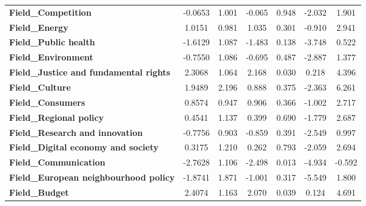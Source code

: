 \documentclass[ 11pt]{article}
\begin{document}
\begin{center}
\begin{longtable}{lcccccc}
\textbf{Field\_Competition}                                &      -0.0653  &        1.001     &    -0.065  &         0.948        &       -2.032    &        1.901     \\
\textbf{Field\_Energy}                                     &       1.0151  &        0.981     &     1.035  &         0.301        &       -0.910    &        2.941     \\
\textbf{Field\_Public health}                              &      -1.6129  &        1.087     &    -1.483  &         0.138        &       -3.748    &        0.522     \\
\textbf{Field\_Environment}                                &      -0.7550  &        1.086     &    -0.695  &         0.487        &       -2.887    &        1.377     \\
\textbf{Field\_Justice and fundamental rights}             &       2.3068  &        1.064     &     2.168  &         0.030        &        0.218    &        4.396     \\
\textbf{Field\_Culture}                                    &       1.9489  &        2.196     &     0.888  &         0.375        &       -2.363    &        6.261     \\
\textbf{Field\_Consumers}                                  &       0.8574  &        0.947     &     0.906  &         0.366        &       -1.002    &        2.717     \\
\textbf{Field\_Regional policy}                            &       0.4541  &        1.137     &     0.399  &         0.690        &       -1.779    &        2.687     \\
\textbf{Field\_Research and innovation}                    &      -0.7756  &        0.903     &    -0.859  &         0.391        &       -2.549    &        0.997     \\
\textbf{Field\_Digital economy and society}                &       0.3175  &        1.210     &     0.262  &         0.793        &       -2.059    &        2.694     \\
\textbf{Field\_Communication}                              &      -2.7628  &        1.106     &    -2.498  &         0.013        &       -4.934    &       -0.592     \\
\textbf{Field\_European neighbourhood policy}              &      -1.8741  &        1.871     &    -1.001  &         0.317        &       -5.549    &        1.800     \\
\textbf{Field\_Budget}                                     &       2.4074  &        1.163     &     2.070  &         0.039        &        0.124    &        4.691     \\

\end{longtable}
\end{center}
\end{document}
